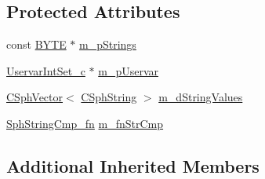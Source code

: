 \subsection*{Protected Attributes}
\begin{DoxyCompactItemize}
\item 
const \hyperlink{sphinxstd_8h_a4ae1dab0fb4b072a66584546209e7d58}{B\-Y\-T\-E} $\ast$ \hyperlink{classExpr__StrIn__c_a5687083f3ca082c2444be3b5d574a586}{m\-\_\-p\-Strings}
\item 
\hyperlink{classUservarIntSet__c}{Uservar\-Int\-Set\-\_\-c} $\ast$ \hyperlink{classExpr__StrIn__c_a955550cd50adb5a5eb15f5aec9329afa}{m\-\_\-p\-Uservar}
\item 
\hyperlink{classCSphVector}{C\-Sph\-Vector}$<$ \hyperlink{structCSphString}{C\-Sph\-String} $>$ \hyperlink{classExpr__StrIn__c_a4d8eb7b215f95ac08dcad3295803c082}{m\-\_\-d\-String\-Values}
\item 
\hyperlink{sphinx_8h_a564bff07e446e0e31a63004937e8347b}{Sph\-String\-Cmp\-\_\-fn} \hyperlink{classExpr__StrIn__c_ab46cab8d0d6ef8c2f6714d1cdf23092b}{m\-\_\-fn\-Str\-Cmp}
\end{DoxyCompactItemize}
\subsection*{Additional Inherited Members}


